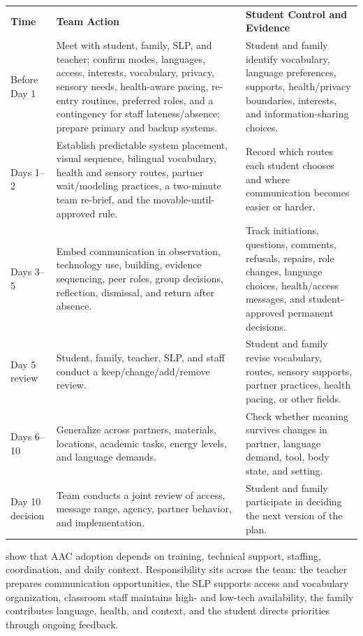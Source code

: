 \documentclass[11pt]{article}
\newcommand{\tableheaderthree}[3]{%
  \rowcolor{PrimaryRed}
  \color{white}\bfseries #1 &
  \color{white}\bfseries #2 &
  \color{white}\bfseries #3 \\
}
\begin{document}
\begin{longtable}{>{\RaggedRight\arraybackslash}p{0.60in} >{\RaggedRight\arraybackslash}p{3.65in} >{\RaggedRight\arraybackslash}p{2.80in}}
\tableheaderthree{Time}{Team Action}{Student Control and Evidence}
Before Day 1 & Meet with student, family, SLP, and teacher; confirm modes, languages, access, interests, vocabulary, privacy, sensory needs, health-aware pacing, re-entry routines, preferred roles, and a contingency for staff lateness/absence; prepare primary and backup systems. & Student and family identify vocabulary, language preferences, supports, health/privacy boundaries, interests, and information-sharing choices. \\
\rowcolor{SoftGray}
Days 1--2 & Establish predictable system placement, visual sequence, bilingual vocabulary, health and sensory routes, partner wait/modeling practices, a two-minute team re-brief, and the movable-until-approved rule. & Record which routes each student chooses and where communication becomes easier or harder. \\
Days 3--5 & Embed communication in observation, technology use, building, evidence sequencing, peer roles, group decisions, reflection, dismissal, and return after absence. & Track initiations, questions, comments, refusals, repairs, role changes, language choices, health/access messages, and student-approved permanent decisions. \\
\rowcolor{SoftGray}
Day 5 review & Student, family, teacher, SLP, and staff conduct a keep/change/add/remove review. & Student and family revise vocabulary, routes, sensory supports, partner practices, health pacing, or other fields. \\
Days 6--10 & Generalize across partners, materials, locations, academic tasks, energy levels, and language demands. & Check whether meaning survives changes in partner, language demand, tool, body state, and setting. \\
\rowcolor{SoftGray}
Day 10 decision & Team conducts a joint review of access, message range, agency, partner behavior, and implementation. & Student and family participate in deciding the next version of the plan. \\
\end{longtable}
\normalsize

\vspace{-0.5cm}
\citet{norrie2021context} show that AAC adoption depends on training, technical support, staffing, coordination, and daily context. Responsibility sits across the team: the teacher prepares communication opportunities, the SLP supports access and vocabulary organization, classroom staff maintains high- and low-tech availability, the family contributes language, health, and context, and the student directs priorities through ongoing feedback.
\end{document}
